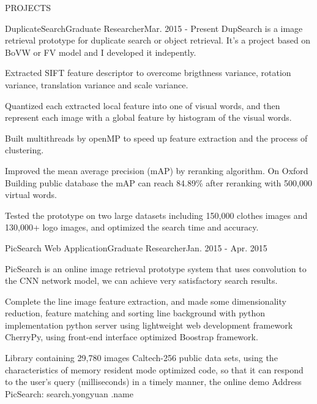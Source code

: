 \documentclass{resume} %
\begin{document}

\begin{rSection}{PROJECTS}

\begin{pSubsection}{DuplicateSearch}{Graduate Researcher}{Mar. 2015 - Present}
DupSearch is a image retrieval prototype for duplicate search or object retrieval. It's a project based on BoVW or FV model and I developed it indepently.
\item Extracted SIFT feature descriptor to overcome brigthness variance, rotation variance, translation variance and scale variance.
\item Quantized each extracted local feature into one of visual words, and then represent each image with a global feature by histogram of the visual words.
\item Built multithreads by openMP to speed up feature extraction and the process of clustering.
\item Improved the mean average precision (mAP) by reranking algorithm. On Oxford Building public database the mAP can reach 84.89\% after reranking with 500,000 virtual words.
\item Tested the prototype on two large datasets including 150,000 clothes images and 130,000+ logo images, and optimized the search time and accuracy.
\end{pSubsection}
\vspace{-0.5em}


\begin{pSubsection}{PicSearch Web Application}{Graduate Researcher}{Jan. 2015 - Apr. 2015}
\item PicSearch is an online image retrieval prototype system that uses convolution to the CNN network model, we can achieve very satisfactory search results.
\item Complete the line image feature extraction, and made some dimensionality reduction, feature matching and sorting line background with python implementation python server using lightweight web development framework CherryPy, using front-end interface optimized Boostrap framework.
\item Library containing 29,780 images Caltech-256 public data sets, using the characteristics of memory resident mode optimized code, so that it can respond to the user's query (milliseconds) in a timely manner, the online demo Address PicSearch: search.yongyuan .name
\end{pSubsection}
\vspace{-0.5em}


\end{rSection}
\end{document}
